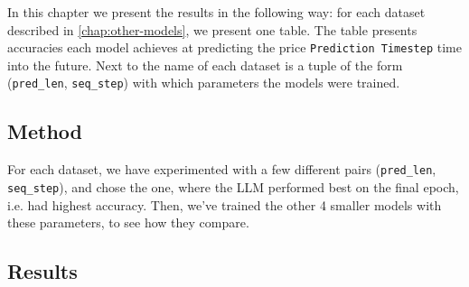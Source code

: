In this chapter we present the results in the following way: for each dataset described in \autoref{chap:other-models}, we present one table. The table presents accuracies each model achieves at predicting the price \verb|Prediction Timestep| time into the future. Next to the name of each dataset is a tuple of the form (\verb|pred_len|, \verb|seq_step|) with which parameters the models were trained.
\subsection{Method}
For each dataset, we have experimented with a few different pairs (\verb|pred_len|, \verb|seq_step|), and chose the one, where the LLM performed best on the final epoch, i.e. had highest accuracy. Then, we've trained the other 4 smaller models with these parameters, to see how they compare.

\subsection{Results}





